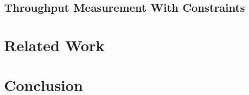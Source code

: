 \documentclass[12pt]{cmuthesis}
\begin{document}
\section{Throughput Measurement With Constraints}

\chapter{Related Work}
\chapter{Conclusion}

%

\backmatter


\renewcommand{\bibsection}{\chapter{\bibname}}

\end{document}
